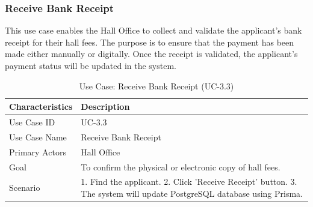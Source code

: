 \subsubsection{Receive Bank Receipt}
This use case enables the Hall Office to collect and validate the applicant's bank receipt for their hall fees. The purpose is to ensure that the payment has been made either manually or digitally. Once the receipt is validated, the applicant's payment status will be updated in the system.
\begin{table}[H]
    \centering
    \small
    \renewcommand{\arraystretch}{1.4}
    \caption{Use Case: Receive Bank Receipt (UC-3.3)} %
    \label{tab:receive-bank-receipt}
    \begin{tabular}{|l|p{10cm}|} 
        \hline
        \rowcolor[gray]{0.9} {Characteristics} & {Description} \\ \hline
        Use Case ID & UC-3.3 \\ \hline
        Use Case Name & Receive Bank Receipt \\ \hline
        Primary Actors & Hall Office \\ \hline
        Goal & To confirm the physical or electronic copy of hall fees. \\ \hline
        Scenario & 1. Find the applicant. 2. Click 'Receive Receipt' button. 3. The system will update PostgreSQL database using Prisma. \\ \hline
    \end{tabular}
\end{table}
\FloatBarrier